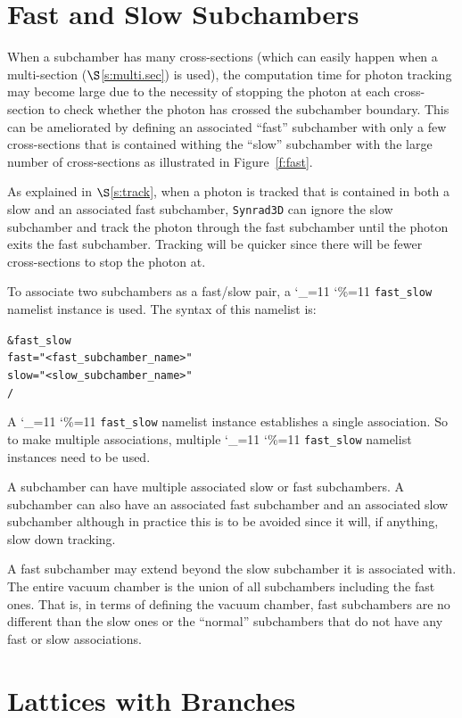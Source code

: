 \documentclass[11pt,openany]{report}
\newcommand{\sref}[1]{$\S$\ref{#1}}
\newcommand{\srthree}{\texttt{Synrad3D}\xspace}
\newcommand\ttcmd{\begingroup\catcode`\_=11 \catcode`\%=11 \dottcmd}
\newcommand\dottcmd[1]{\texttt{#1}\endgroup}
\newcommand{\fig}[1]{Figure~\ref{#1}}
\newcommand{\vn}{\ttcmd}
\newlength{\ExBeg}
\newlength{\ExEnd}
\newenvironment{example}
  {\vspace{\ExBeg} \begin{alltt}}
  {\end{alltt} \vspace{\ExEnd}}
\begin{document}
\section{Fast and Slow Subchambers}
\label{s:fast}

When a subchamber has many cross-sections (which can easily happen when a multi-section
(\sref{s:multi.sec}) is used), the computation time for photon tracking may become large
due to the necessity of stopping the photon at each cross-section to check whether the
photon has crossed the subchamber boundary. This can be ameliorated by defining an
associated ``fast'' subchamber with only a few cross-sections that is contained withing
the ``slow'' subchamber with the large number of cross-sections as illustrated in
\fig{f:fast}.

As explained in \sref{s:track}, when a photon is tracked that is contained in both a slow
and an associated fast subchamber, \srthree can ignore the slow subchamber and track the
photon through the fast subchamber until the photon exits the fast subchamber. Tracking
will be quicker since there will be fewer cross-sections to stop the photon at.

To associate two subchambers as a fast/slow pair, a \vn{fast_slow} namelist instance is used.
The syntax of this namelist is:
\begin{example}
  &fast_slow
    fast = "<fast_subchamber_name>"
    slow = "<slow_subchamber_name>"
  /
\end{example}
A \vn{fast_slow} namelist instance establishes a single association. So to make multiple
associations, multiple \vn{fast_slow} namelist instances need to be used.

A subchamber can have multiple associated slow or fast subchambers. A subchamber can also
have an associated fast subchamber and an associated slow subchamber although in practice
this is to be avoided since it will, if anything, slow down tracking.

A fast subchamber may extend beyond the slow subchamber it is associated with. The entire
vacuum chamber is the union of all subchambers including the fast ones. That is, in terms
of defining the vacuum chamber, fast subchambers are no different than the slow ones or
the ``normal'' subchambers that do not have any fast or slow associations.

\section{Lattices with Branches}
\label{s:lat.branch}
\end{document}
